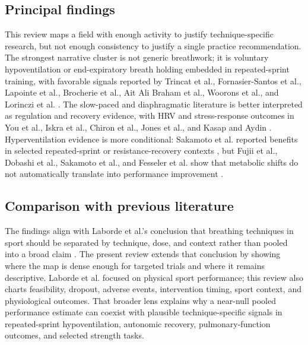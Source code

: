 \documentclass[12pt,a4paper]{article}
\begin{document}
\subsection{Principal findings}
This review maps a field with enough activity to justify technique-specific research, but not enough consistency to justify a single practice recommendation. The strongest narrative cluster is not generic breathwork; it is voluntary hypoventilation or end-expiratory breath holding embedded in repeated-sprint training, with favorable signals reported by Trincat et al., Fornasier-Santos et al., Lapointe et al., Brocherie et al., Ait Ali Braham et al., Woorons et al., and Lorinczi et al. \parencite{trincat_repeated-sprint_2017,fornasier-santos_repeated-sprint_2018,lapointe_impact_2020,brocherie_effects_2023,ait_ali_braham_m_and_ouchen_y_and_woorons_x_effects_2024,woorons_x_and_faucher_c_and_dufour_sp_and_brocherie_f_and_robach_p_and_connes_p_and_brugniaux_jv_and_verges_s_and_gaston_af_and_millet_g_and_dupuy_o_and_pichon_a_hypoventilation_2024,lorinczi_additional_2025}. The slow-paced and diaphragmatic literature is better interpreted as regulation and recovery evidence, with HRV and stress-response outcomes in You et al., Iskra et al., Chiron et al., Jones et al., and Kasap and Aydin \parencite{you_m_and_laborde_s_and_ackermann_s_and_borges_u_and_dosseville_f_and_mosley_e_influence_2024,iskra_m_and_laborde_s_and_poppa_t_and_salvotti_c_and_weinand_e_and_raab_m_and_voigt_l_specifying_2026,chiron_f_and_guloren_b_and_erblang_m_and_poirier_c_and_elbaz_m_and_servonnet_a_and_gaudin_m_and_le_coz_c_and_lopes_p_and_chennaoui_m_and_hanon_c_and_leger_d_and_thomas_c_exploring_2026,jones_effectiveness_2026,kasap_m_and_aydin_gr_box_2025}. Hyperventilation evidence is more conditional: Sakamoto et al. reported benefits in selected repeated-sprint or resistance-recovery contexts \parencite{sakamoto_a_and_naito_h_and_chow_cm_hyperventilation_2014,sakamoto_hyperventilation-aided_2020}, but Fujii et al., Dobashi et al., Sakamoto et al., and Fesseler et al. show that metabolic shifts do not automatically translate into performance improvement \parencite{fujii_effect_2015,dobashi_voluntary_2021,sakamoto_a_and_naito_h_and_chow_cm_effects_2018,fesseler_l_and_patzak_a_and_heinz_v_and_le_ns_and_opatz_o_and_pilz_n_and_bothe_tl_effect_2026}.

\subsection{Comparison with previous literature}
The findings align with Laborde et al.'s conclusion that breathing techniques in sport should be separated by technique, dose, and context rather than pooled into a broad claim \parencite{Laborde31122024}. The present review extends that conclusion by showing where the map is dense enough for targeted trials and where it remains descriptive. Laborde et al. focused on physical sport performance; this review also charts feasibility, dropout, adverse events, intervention timing, sport context, and physiological outcomes. That broader lens explains why a near-null pooled performance estimate can coexist with plausible technique-specific signals in repeated-sprint hypoventilation, autonomic recovery, pulmonary-function outcomes, and selected strength tasks.
\end{document}
